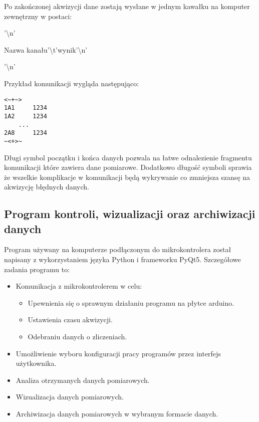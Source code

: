 Po zakończonej akwizycji dane zostają wysłane w jednym kawałku na komputer zewnętrzny w postaci:
\begin{description}
        \item \detokenize{<~+~>}'\textbackslash n'
        \item {Nazwa kanału}'\textbackslash t'{wynik}'\textbackslash n'
        \item \detokenize{~<+>~}'\textbackslash n'
\end{description}
Przykład komunikacji wygląda następująco:
\begin{lstlisting}
<~+~>
1A1     1234
1A2     1234 
    ...
2A8     1234
~<+>~
\end{lstlisting}

Długi symbol początku i końca danych pozwala na łatwe odnalezienie fragmentu komunikacji które zawiera dane pomiarowe. Dodatkowo długość symboli sprawia że wszelkie komplikacje w komunikacji będą wykrywanie co zmniejsza szansę na akwizycję błędnych danych. 

\subsection{Program kontroli, wizualizacji oraz archiwizacji danych}

Program używany na komputerze podłączonym do mikrokontrolera został napisany z wykorzystaniem języka Python i frameworku PyQt5.
Szczegółowe zadania programu to:
\begin{itemize}
        \item Komunikacja z mikrokontrolerem w celu:
        \begin{itemize}
                \item Upewnienia się o sprawnym działaniu programu na płytce arduino.
                \item Ustawienia czasu akwizycji.
                \item Odebraniu danych o zliczeniach. 
        \end{itemize}
        \item Umożliwienie wyboru konfiguracji pracy programów przez interfejs użytkownika.
        \item Analiza otrzymanych danych pomiarowych.
        \item Wizualizacja danych pomiarowych.
        \item Archiwizacja danych pomiarowych w wybranym formacie danych.
\end{itemize}

